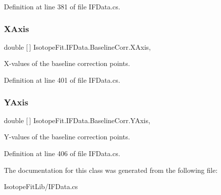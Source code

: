 Definition at line 381 of file I\+F\+Data.\+cs.

\mbox{\label{class_isotope_fit_1_1_i_f_data_1_1_baseline_corr_a90e35ea8c62d07f0279f4b5f7d440491}} 
\subsubsection{\texorpdfstring{X\+Axis}{XAxis}}
{\footnotesize\ttfamily double \mbox{[}$\,$\mbox{]} Isotope\+Fit.\+I\+F\+Data.\+Baseline\+Corr.\+X\+Axis\hspace{0.3cm}{\ttfamily [get]}, {\ttfamily [set]}}



X-\/values of the baseline correction points. 



Definition at line 401 of file I\+F\+Data.\+cs.

\mbox{\label{class_isotope_fit_1_1_i_f_data_1_1_baseline_corr_aa71067f79827da27836daa705413133c}} 
\subsubsection{\texorpdfstring{Y\+Axis}{YAxis}}
{\footnotesize\ttfamily double \mbox{[}$\,$\mbox{]} Isotope\+Fit.\+I\+F\+Data.\+Baseline\+Corr.\+Y\+Axis\hspace{0.3cm}{\ttfamily [get]}, {\ttfamily [set]}}



Y-\/values of the baseline correction points. 



Definition at line 406 of file I\+F\+Data.\+cs.



The documentation for this class was generated from the following file\+:\begin{DoxyCompactItemize}
\item 
Isotope\+Fit\+Lib/I\+F\+Data.\+cs\end{DoxyCompactItemize}
